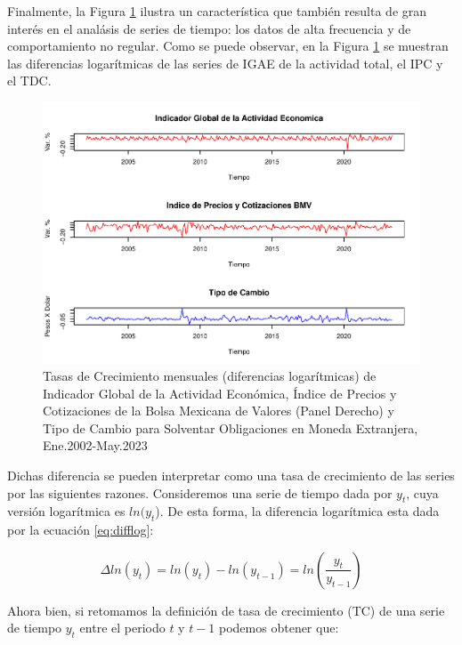 \documentclass[
]{book}
\begin{document}
Finalmente, la Figura \ref{fig:fig5} ilustra un característica que también resulta de gran interés en el analásis de series de tiempo: los datos de alta frecuencia y de comportamiento no regular. Como se puede observar, en la Figura \ref{fig:fig5} se muestran las diferencias logarítmicas de las series de IGAE de la actividad total, el IPC y el TDC.

\begin{figure}

{\centering \includegraphics{bookdown-demo_files/figure-latex/fig5-1} 

}

\caption{Tasas de Crecimiento mensuales (diferencias logarítmicas) de Indicador Global de la Actividad Económica, Índice de Precios y Cotizaciones de la Bolsa Mexicana de Valores (Panel Derecho) y Tipo de Cambio para Solventar Obligaciones en Moneda Extranjera, Ene.2002-May.2023}\label{fig:fig5}
\end{figure}

Dichas diferencia se pueden interpretar como una tasa de crecimiento de las series por las siguientes razones. Consideremos una serie de tiempo dada por \(y_t\), cuya versión logarítmica es \(ln(y_t\)). De esta forma, la diferencia logarítmica esta dada por la ecuación \eqref{eq:difflog}:

\begin{equation}
   \Delta ln(y_t) = ln(y_t) - ln(y_{t-1}) = ln \left( \frac{y_t}{y_{t-1}} \right)
   \label{eq:difflog}
\end{equation}

Ahora bien, si retomamos la definición de tasa de crecimiento (TC) de una serie de tiempo \(y_t\) entre el periodo \(t\) y \(t-1\) podemos obtener que:
\end{document}
